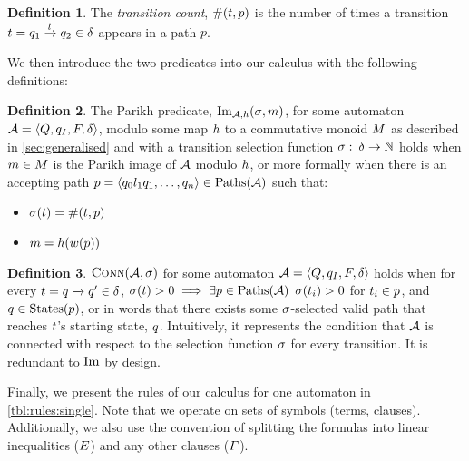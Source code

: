 \documentclass[acmsmall,review,anonymous,screen]{acmart}\settopmatter{printfolios=true,printccs=false,printacmref=true}
\theoremstyle{definition}
\newtheorem{definition}{Definition}[section]
\begin{document}
\begin{definition}
 The \textit{transition count}, $\operatorname{\#}(t, p)$ is the
 number of times a transition $t =
 q_1 \xrightarrow{l} q_2 \in \delta$ appears in a path
 $p$.
\end{definition}

We then introduce the two predicates into our calculus with the following
definitions:

\begin{definition}\label{def:single-image}
  The Parikh predicate, $\operatorname{Im}_{\mathcal{A}, h}(\operatorname{\sigma}, m)$, for some automaton
  $\mathcal{A} = \left\langle Q, q_I, F, \delta\right\rangle$, modulo some map $h$ to a commutative monoid
  $M$ as described in \cref{sec:generalised} and with a transition
  selection function $\operatorname{\sigma}:\: \delta \to \mathbb{N}$ holds when
  $m \in M$ is the Parikh image of $\mathcal{A}$ modulo
  $h$, or more formally when there is an accepting path $p =
  \left\langle q_0 l_1 q_1 , \ldots , q_n\right\rangle \in \operatorname{Paths}(\mathcal{A})$ such that:
  \begin{itemize}
    \item $\operatorname{\sigma}(t) = \operatorname{\#}(t, p)$
    \item $m = h(w(p))$
  \end{itemize}
\end{definition}

\begin{definition}
  $\operatorname{\textsc{Conn}}(\mathcal{A}, \operatorname{\sigma})$ for some automaton $\mathcal{A} =
  \left\langle Q, q_I, F, \delta\right\rangle$ holds when for every $t =
  q \xrightarrow{} q' \in \delta$, $\operatorname{\sigma}(t) > 0
  \implies \exists p \in \operatorname{Paths}(\mathcal{A})$ $\operatorname{\sigma}(t_i) > 0$
  for $t_i \in p$, and $q \in \operatorname{States}(p)$, or in words that
  there exists some $\operatorname{\sigma}$-selected valid path that reaches $t$'s
  starting state, $q$. Intuitively, it represents the condition that
  $\mathcal{A}$ is connected with respect to the selection function $\operatorname{\sigma}$ for
  every transition. It is redundant to $\operatorname{Im}$ by design.
\end{definition}

Finally, we present the rules of our calculus for one automaton in
\cref{tbl:rules:single}. Note that we operate on sets of symbols (terms,
clauses). Additionally, we also use the convention of splitting the formulas
into linear inequalities ($E$) and any other clauses
($\varGamma$).
\end{document}
